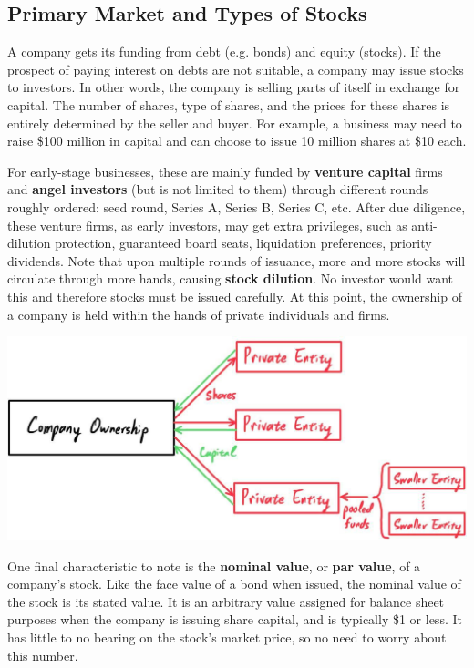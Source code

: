 \documentclass{article}
\begin{document}
  \subsection{Primary Market and Types of Stocks}

    A company gets its funding from debt (e.g. bonds) and equity (stocks). If the prospect of paying interest on debts are not suitable, a company may issue stocks to investors. In other words, the company is selling parts of itself in exchange for capital. The number of shares, type of shares, and the prices for these shares is entirely determined by the seller and buyer. For example, a business may need to raise \$100 million in capital and can choose to issue 10 million shares at \$10 each.

    For early-stage businesses, these are mainly funded by \textbf{venture capital} firms and \textbf{angel investors} (but is not limited to them) through different rounds roughly ordered: seed round, Series A, Series B, Series C, etc. After due diligence, these venture firms, as early investors, may get extra privileges, such as anti-dilution protection, guaranteed board seats, liquidation preferences, priority dividends. Note that upon multiple rounds of issuance, more and more stocks will circulate through more hands, causing \textbf{stock dilution}. No investor would want this and therefore stocks must be issued carefully. At this point, the ownership of a company is held within the hands of private individuals and firms.
    \begin{center}
        \includegraphics[scale=0.25]{img/company_in_private_hands.jpg}
    \end{center}
    One final characteristic to note is the \textbf{nominal value}, or \textbf{par value}, of a company's stock. Like the face value of a bond when issued, the nominal value of the stock is its stated value. It is an arbitrary value assigned for balance sheet purposes when the company is issuing share capital, and is typically \$1 or less. It has little to no bearing on the stock's market price, so no need to worry about this number.
\end{document}

